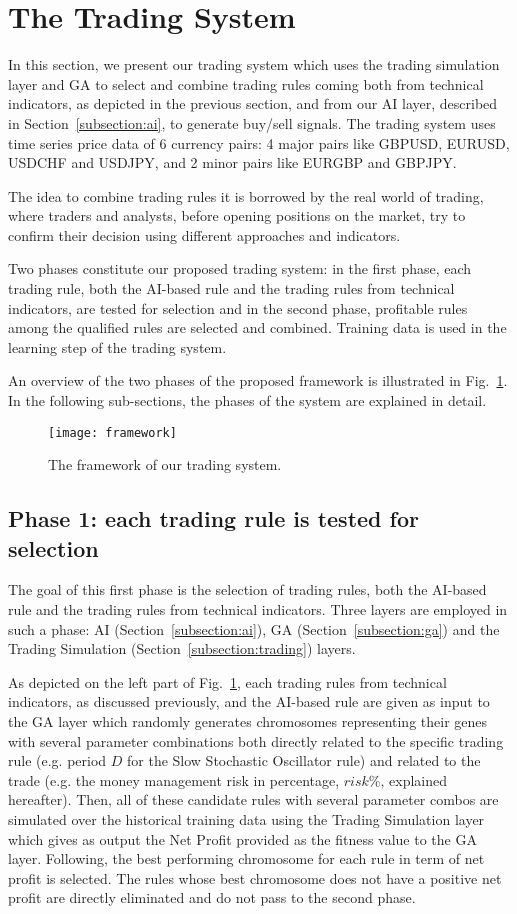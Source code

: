 \section{The Trading System}
In this section, we present our trading system which uses the trading simulation layer and GA to select and combine trading rules coming both from technical indicators, as depicted in the previous section, and from our AI layer, described in Section~\ref{subsection:ai}, to generate buy/sell signals. The trading system uses time series price data of 6 currency pairs: 4 major pairs like GBPUSD, EURUSD, USDCHF and USDJPY, and 2 minor pairs like EURGBP and GBPJPY.

The idea to combine trading rules it is borrowed by the real world of trading, where traders and analysts, before opening positions on the market, try to confirm their decision using different approaches and indicators. 

Two phases constitute our proposed trading system: in the first phase, each trading rule, both the AI-based rule and the trading rules from technical indicators, are tested for selection and in the second phase, profitable rules among the qualified rules are selected and combined. Training data is used in the learning step of the trading system.

An overview of the two phases of the proposed framework is illustrated in Fig.~\ref{fig:sys}. In the following sub-sections, the phases of the system are explained in detail.

\begin{figure}[h]
\texttt{[image: framework]}
\centering
\caption{The framework of our trading system.}
\label{fig:sys} 
\end{figure}

\subsection{Phase 1: each trading rule is tested for selection}
The goal of this first phase is the selection of trading rules, both the AI-based rule and the trading rules from technical indicators. Three layers are employed in such a phase: AI (Section~\ref{subsection:ai}), GA (Section~\ref{subsection:ga}) and the Trading Simulation (Section~\ref{subsection:trading}) layers. 

As depicted on the left part of Fig.~\ref{fig:sys}, each trading rules from technical indicators, as discussed previously, and the AI-based rule are given as input to the GA layer which randomly generates chromosomes representing their genes with several parameter combinations both directly related to the specific trading rule (e.g. period $D$ for the Slow Stochastic Oscillator rule) and related to the trade (e.g. the money management risk in percentage, $risk\%$, explained hereafter). Then, all of these candidate rules with several parameter combos are simulated over the historical training data using the Trading Simulation layer which gives as output the Net Profit provided as the fitness value to the GA layer. Following, the best performing chromosome for each rule in term of net profit is selected. 
The rules whose best chromosome does not have a positive net profit are directly eliminated and do not pass to the second phase.


